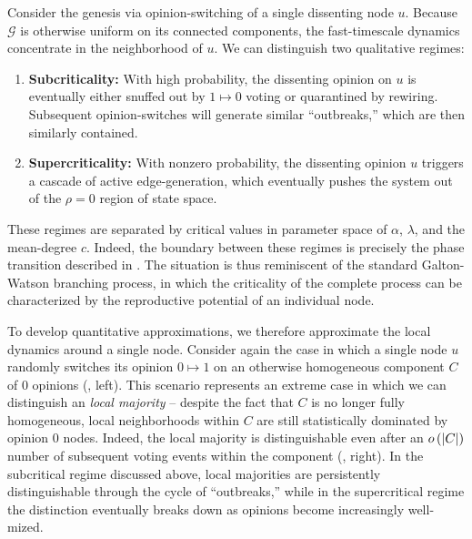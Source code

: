 \documentclass[review, onefignum, onetabnum]{siamart171218}
\begin{document}
	    Consider the genesis via opinion-switching of a single dissenting node $u$. 
	    Because $\mathcal{G}$ is otherwise uniform on its connected components, the fast-timescale dynamics concentrate in the neighborhood of $u$. 
    	We can distinguish two qualitative regimes: 
    	\begin{enumerate}
    		\item \textbf{Subcriticality:} With high probability, the dissenting opinion on $u$ is eventually either snuffed out by $1\mapsto 0$ voting or quarantined by rewiring. 
    		Subsequent opinion-switches will generate similar ``outbreaks,'' which are then similarly contained.   
    		\item \textbf{Supercriticality:} With nonzero probability, the dissenting opinion $u$ triggers a cascade of active edge-generation, which eventually pushes the system out of the $\rho = 0$ region of state space. 
    	\end{enumerate}
    	These regimes are separated by critical values in parameter space of $\alpha$, $\lambda$, and the mean-degree $c$. 
    	Indeed, the boundary between these regimes is precisely the phase transition described in . 
    	The situation is thus reminiscent of the standard Galton-Watson branching process, in which the criticality of the complete process can be characterized by the reproductive potential of an individual node. 
    	
    	To develop quantitative approximations, we therefore approximate the local dynamics around a single node. 
    	Consider again the case in which a single node $u$ randomly switches its opinion $0 \mapsto 1$ on an otherwise homogeneous component $C$ of $0$ opinions (, left). 
		This scenario represents an extreme case in which we can distinguish an \emph{local majority} -- despite the fact that $C$ is no longer fully homogeneous, local neighborhoods within $C$ are still statistically dominated by opinion $0$ nodes. 
		Indeed, the local majority is distinguishable even after an $o\left(\left|C\right|\right)$ number of subsequent voting events within the component (, right). 
        In the subcritical regime discussed above, local majorities are persistently distinguishable through the cycle of ``outbreaks,'' while in the supercritical regime the distinction eventually breaks down as opinions become increasingly well-mized. 
        
\end{document}
